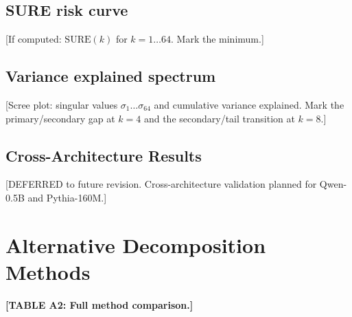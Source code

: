 \documentclass[11pt]{article}
\begin{document}
\subsection{SURE risk curve}
[If computed: $\text{SURE}(k)$ for $k=1 \ldots 64$. Mark the minimum.]

\subsection{Variance explained spectrum}
[Scree plot: singular values $\sigma_1 \ldots \sigma_{64}$ and cumulative
variance explained. Mark the primary/secondary gap at $k=4$ and the
secondary/tail transition at $k=8$.]

\subsection{Cross-Architecture Results}
[DEFERRED to future revision. Cross-architecture validation planned
for Qwen-0.5B and Pythia-160M.]



\section{Alternative Decomposition Methods}
\label{app:alternative_methods}


\textbf{[TABLE A2: Full method comparison.]}
\end{document}
